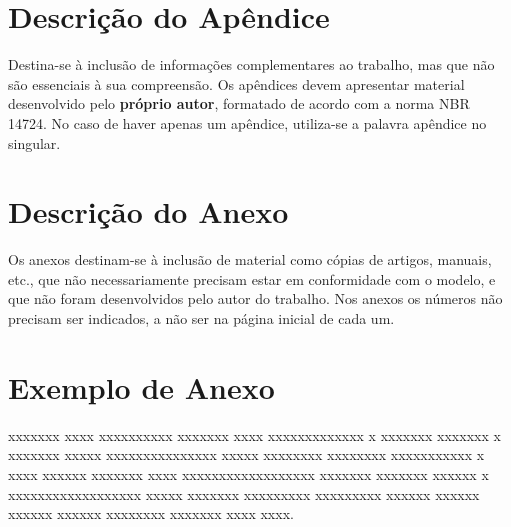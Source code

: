 \appendix

\chapter*{Descrição do Apêndice}

Destina-se à inclusão de informações complementares ao trabalho, mas que não são essenciais à sua compreensão. Os apêndices devem apresentar material desenvolvido pelo \textbf{próprio autor}, formatado de acordo com a norma NBR 14724. No caso de haver apenas um apêndice, utiliza-se a palavra apêndice no singular.

\annex

\chapter{Descrição do Anexo}

Os anexos destinam-se à inclusão de material como cópias de artigos, manuais, etc., que não necessariamente precisam estar em conformidade com o modelo, e que não foram desenvolvidos pelo autor do trabalho. Nos anexos os números não precisam ser indicados, a não ser na página inicial de cada um. 

\chapter{Exemplo de Anexo}

xxxxxxx xxxx xxxxxxxxxx xxxxxxx xxxx xxxxxxxxxxxxx x xxxxxxx xxxxxxx x xxxxxxx xxxxx xxxxxxxxxxxxxxx xxxxx xxxxxxxx xxxxxxxx xxxxxxxxxxx x xxxx xxxxxx xxxxxxx xxxx xxxxxxxxxxxxxxxxxx xxxxxxx xxxxxxx xxxxxx x xxxxxxxxxxxxxxxxxx xxxxx xxxxxxx xxxxxxxxx xxxxxxxxx xxxxxx xxxxxx xxxxxx xxxxxx xxxxxxxx xxxxxxx xxxx xxxx.

